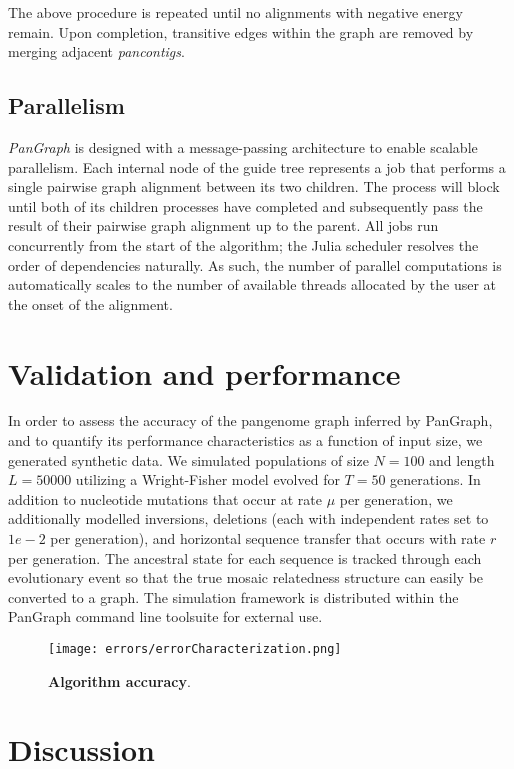 \documentclass[aps,rmp,reprint,superscriptaddress,notitlepage,10pt]{revtex4-1}
\begin{document}
The above procedure is repeated until no alignments with negative energy remain.
Upon completion, transitive edges within the graph are removed by merging adjacent \emph{pancontigs}.

\subsection{Parallelism}
\emph{PanGraph} is designed with a message-passing architecture to enable scalable parallelism.
Each internal node of the guide tree represents a job that performs a single pairwise graph alignment between its two children.
The process will block until both of its children processes have completed and subsequently pass the result of their pairwise graph alignment up to the parent.
All jobs run concurrently from the start of the algorithm; the Julia scheduler resolves the order of dependencies naturally.
As such, the number of parallel computations is automatically scales to the number of available threads allocated by the user at the onset of the alignment.

\section{Validation and performance}
In order to assess the accuracy of the pangenome graph inferred by PanGraph, and to quantify its performance 
characteristics as a function of input size, we generated synthetic data.
We simulated populations of size $N=100$ and length $L=50000$ utilizing a Wright-Fisher model evolved for $T=50$ generations.
In addition to nucleotide mutations that occur at rate $\mu$ per generation, we additionally modelled inversions, deletions (each with independent rates set to $1e-2$ per generation), and horizontal sequence transfer that occurs with rate $r$ per generation.
The ancestral state for each sequence is tracked through each evolutionary event so that the true mosaic relatedness structure can easily be converted to a graph.
The simulation framework is distributed within the PanGraph command line toolsuite for external use.

\begin{figure*}[htb]
    \texttt{[image: errors/errorCharacterization.png]}
    \caption{{\bf Algorithm accuracy}.}
    \label{fig:accuracy}
\end{figure*}

\section{Discussion}

{}
\end{document}
